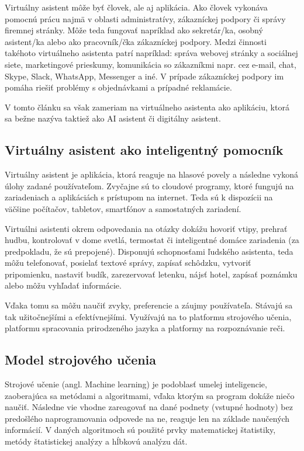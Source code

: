 \documentclass[10pt,twoside,slovak,coursepaper]{article}
\begin{document}
Virtuálny asistent môže byť človek, ale aj aplikácia. Ako človek vykonáva pomocnú prácu najmä v oblasti administratívy, zákazníckej podpory či správy firemnej stránky. Môže teda fungovať napríklad ako sekretár/ka, osobný asistent/ka alebo ako pracovník/čka zákazníckej podpory. Medzi činnosti takéhoto virtuálneho asistenta patrí napríklad: správa webovej stránky a sociálnej siete, marketingové prieskumy, komunikácia so zákazníkmi napr. cez e-mail, chat, Skype, Slack, WhatsApp, Messenger a iné. V prípade zákazníckej podpory im pomáha riešiť problémy s objednávkami a prípadné reklamácie.\cite{Bouhanikova}

V tomto článku sa však zameriam na virtuálneho asistenta ako aplikáciu, ktorá sa bežne nazýva taktiež ako AI asistent či digitálny asistent. 

\subsection{Virtuálny asistent ako inteligentný pomocník}

Virtuálny asistent je aplikácia, ktorá reaguje na hlasové povely a následne vykoná úlohy zadané používateľom. Zvyčajne sú to cloudové programy, ktoré fungujú na zariadeniach a aplikáciách s prístupom na internet. Teda sú k dispozícii na väčšine počítačov, tabletov, smartfónov a samostatných zariadení.\cite{Gupta}

Virtuálni asistenti \cite{McLaughlin} okrem odpovedania na otázky dokážu hovoriť vtipy, prehrať hudbu, kontrolovať v dome svetlá, termostat či inteligentné domáce zariadenia (za predpokladu, že sú prepojené). Disponujú schopnosťami ľudského asistenta, teda môžu telefonovať, posielať textové správy, zapísať schôdzku, vytvoriť pripomienku, nastaviť budík, zarezervovať letenku, nájsť hotel, zapísať poznámku alebo môžu vyhľadať informácie.

Vďaka tomu sa môžu naučiť zvyky, preferencie a záujmy používateľa. Stávajú sa tak užitočnejšími a efektívnejšími. Využívajú na to platformu strojového učenia, platformu spracovania prirodzeného jazyka a platformy na rozpoznávanie reči.\cite{Botelho}

\subsection{Model strojového učenia}

Strojové učenie (angl. Machine learning) \cite{Cibula} je podoblasť umelej inteligencie, zaoberajúca sa metódami a algoritmami, vďaka ktorým sa program dokáže niečo naučiť. Následne vie vhodne zareagovať na dané podnety (vstupné hodnoty) bez predošlého naprogramovania odpovede na ne, reaguje len na základe naučených informácií. V daných algoritmoch sú použité prvky matematickej štatistiky, metódy štatistickej analýzy a hĺbkovú analýzu dát.
\end{document}
